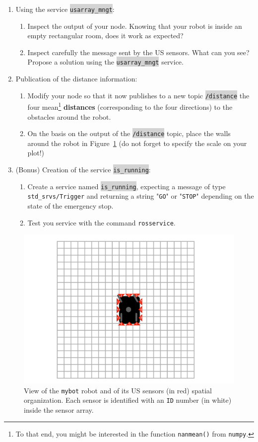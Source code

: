 \documentclass[10pt,a4paper,english]{exam}
\newcounter{mainmemorder}
\newcommand{\load}{\setcounter{enumi}{\value{mainmemorder}}}
\newcommand{\mytext}[1]{\colorbox{lightgray}{\texttt{#1}}}
\begin{document}
\begin{enumerate}
	\load
	\item Using the service \mytext{usarray\_mngt}:
	      \begin{enumerate}
		      \item Inspect the output of your node. Knowing that your robot is inside an empty
		            rectangular room, does it work as expected?
		      \item Inspect carefully the message sent by the US sensors. What can you see? Propose
		            a solution using the \mytext{usarray\_mngt} service.
	      \end{enumerate}
	\item Publication of the distance information:
	      \begin{enumerate}
		      \item Modify your node so that it now publishes to a new topic \mytext{/distance} the
		            four mean\footnote{To that end, you might be interested in the function
			            \texttt{nanmean()} from \texttt{numpy}.} \textbf{distances} (corresponding to the
		            four directions) to the obstacles around the robot.
		      \item On the basis on the output of the \mytext{/distance} topic, place the walls
		            around the robot in Figure~\ref{fig:robot} (do not forget to specify the scale on your
		            plot!)
	      \end{enumerate}
	\item (Bonus) Creation of the service \mytext{is\_running}:
	      \begin{enumerate}
		      \item Create a service named \mytext{is\_running}, expecting a message of type
		            \texttt{std\_srvs/Trigger} and returning a string "\texttt{GO}" or "\texttt{STOP}"
		            depending on the state of the emergency stop.
		      \item Test you service with the command \texttt{rosservice}.
	      \end{enumerate}

\end{enumerate}

\newpage

\begin{figure}
	\includegraphics[width=\linewidth]{images/robot.pdf}
	\caption{View of the \texttt{mybot} robot and of its US sensors (in red) spatial organization.
		Each sensor is identified with an \texttt{ID} number (in white) inside the sensor array.}
	\label{fig:robot}
\end{figure}
\end{document}
